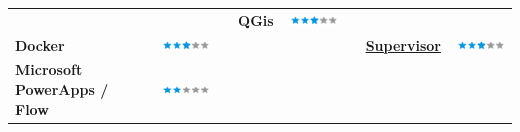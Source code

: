 \documentclass[]{friggeri-cv}
\begin{document}
\begin{table}[!h]
\begin{tabular}{L{3.25cm}cL{2cm}L{2.25cm}cL{2cm}L{2.25cm}c}
		& 
		&&
		\textbf{QGis} & \includegraphics[scale=0.40]{img/3stars.png} \\
		\textbf{Docker}&
		\includegraphics[scale=0.40]{img/3stars.png} &&
		&
		&&
		\href{https://snowdengroup.com/software/supervisor/}{\textbf{Supervisor}}&
		\includegraphics[scale=0.40]{img/3stars.png}\\
		\textbf{Microsoft PowerApps / Flow}&
		\includegraphics[scale=0.40]{img/2stars.png}&&
		&
		&&
		&
	\end{tabular}
\end{table}
\end{document}

